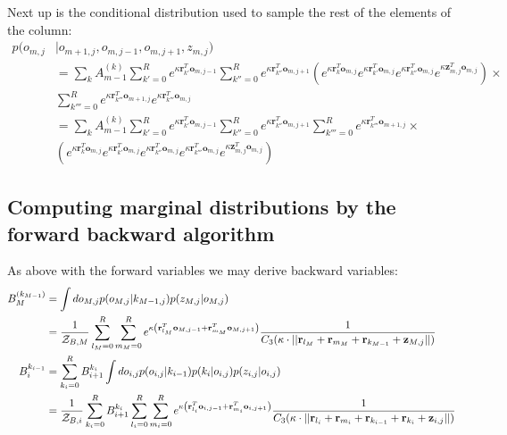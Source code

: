\documentclass[11pt]{article}
\newcommand{\mc}{\mathcal}
\begin{document}
Next up is the conditional distribution used to sample the rest of the elements of the column:
%
\begin{align*}
	p(o_{m,j}&|o_{m+1,j},o_{m,j-1},o_{m,j+1},z_{m,j}) \\
	&=\sum_k A_{m-1}^{(k)} \sum_{k'=0}^R e^{\kappa \mathbf{r}_{k'}^T \mathbf{o}_{m,j-1}} \sum_{k''=0}^R e^{\kappa \mathbf{r}_{k''}^T \mathbf{o}_{m,j+1}}\left( e^{\kappa\mathbf{r}_k^T\mathbf{o}_{m,j}} e^{\kappa \mathbf{r}_{k'}^T\mathbf{o}_{m,j}} e^{\kappa \mathbf{r}_{k''}^T\mathbf{o}_{m,j}} e^{\kappa \mathbf{z}_{m,j}^T \mathbf{o}_{m,j}}\right) \times \\
	&\sum_{k'''=0}^{R} e^{\kappa \mathbf{r}_{k'''}^T \mathbf{o}_{m+1,j}} e^{\kappa \mathbf{r}_{k'''}^T \mathbf{o}_{m,j}} \\
	&=\sum_k A_{m-1}^{(k)} \sum_{k'=0}^R e^{\kappa \mathbf{r}_{k'}^T \mathbf{o}_{m,j-1}} \sum_{k''=0}^R e^{\kappa \mathbf{r}_{k''}^T \mathbf{o}_{m,j+1}} \sum_{k'''=0}^{R} e^{\kappa \mathbf{r}_{k'''}^T \mathbf{o}_{m+1,j}} \times \\
	&\left( e^{\kappa\mathbf{r}_k^T\mathbf{o}_{m,j}} e^{\kappa \mathbf{r}_{k'}^T\mathbf{o}_{m,j}} e^{\kappa \mathbf{r}_{k''}^T\mathbf{o}_{m,j}} e^{\kappa \mathbf{r}_{k'''}^T \mathbf{o}_{m,j}}e^{\kappa\mathbf{z}_{m,j}^T \mathbf{o}_{m,j}} \right) 
\end{align*}

\subsection{Computing marginal distributions by the forward backward algorithm}

As above with the forward variables we may derive backward variables:
%
\begin{align}
B_M^{(k_{M-1})} &= \int do_{M,j} p(o_{M,j}|k_{M-1,j}) p(z_{M,j}|o_{M,j}) \notag \\
&= \frac{1}{\mc{Z}_{B,M}} \sum_{l_{M}=0}^R \sum_{m_{M}=0}^R 
e^{\kappa\left( \mathbf{r}_{l_{M}}^T \mathbf{o}_{M,j-1}+
\mathbf{r}_{m_{M}}^T \mathbf{o}_{M,j+1}\right)}
\frac{1}{C_3(\kappa\cdot ||\mathbf{r}_{l_{M}}+\mathbf{r}_{m_{M}}+\mathbf{r}_{k_{M-1}}+\mathbf{z}_{M,j}||)} \\
B_i^{k_{i-1}} &= \sum_{k_i=0}^R B_{i+1}^{k_i} \int do_{i,j} p(o_{i,j}|k_{i-1}) p(k_i|o_{i,j}) p(z_{i,j}|o_{i,j}) \notag \\
&= \frac{1}{\mc{Z}_{B,i}}  \sum_{k_i=0}^R B_{i+1}^{k_i}
\sum_{l_{i}=0}^R \sum_{m_{i}=0}^R 
e^{\kappa\left( \mathbf{r}_{l_{i}}^T \mathbf{o}_{i,j-1}+
\mathbf{r}_{m_{i}}^T \mathbf{o}_{i,j+1}\right)}
\frac{1}{C_3(\kappa\cdot ||\mathbf{r}_{l_{i}}+\mathbf{r}_{m_{i}}+\mathbf{r}_{k_{i-1}}+\mathbf{r}_{k_{i}}+\mathbf{z}_{i,j}||)}
\end{align}
\end{document}
